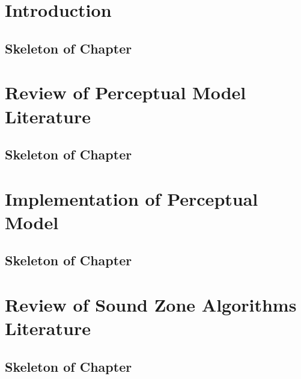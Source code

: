 \documentclass[11pt,twoside,openright,titlepage]{ce}
\begin{document}
\frontmatter
\makecover
\maketitle
\makesignature


\tableofcontents
{}
\listoffigures
\listoftables
\mainmatter

\chapter{Introduction}
\begin{tcolorbox}
\section*{Skeleton of Chapter}

\end{tcolorbox}

\chapter{Review of Perceptual Model Literature}
\begin{tcolorbox}
\section*{Skeleton of Chapter}

\end{tcolorbox}
\newpage


\chapter{Implementation of Perceptual Model}
\begin{tcolorbox}
\section*{Skeleton of Chapter}

\end{tcolorbox}
\newpage



\chapter{Review of Sound Zone Algorithms Literature}
\begin{tcolorbox}
\section*{Skeleton of Chapter}

\end{tcolorbox}
\newpage

\end{document}
